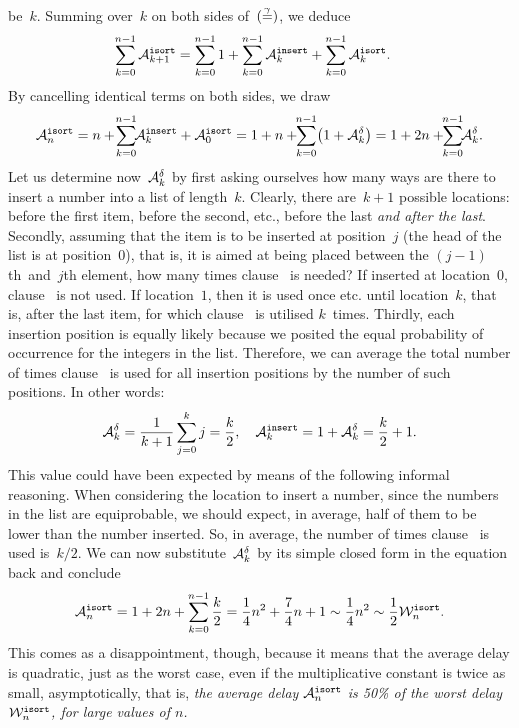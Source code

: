 be~\(k\). Summing over~\(k\) on both sides of~\((\eqn{\gamma})\), we
deduce
\begin{align*}
\sum_{k=0}^{n-1}{\ave{isort}{k+1}} &=
  \sum_{k=0}^{n-1}{1} + \sum_{k=0}^{n-1}{\ave{insert}{k}}
  + \sum_{k=0}^{n-1}{\ave{isort}{k}}.
\end{align*}
By cancelling identical terms on both sides, we draw
\[
\ave{isort}{n} = n + \!\sum_{k=0}^{n-1}{\!\!\ave{insert}{k}} +
                    \ave{isort}{0}
                 = 1 + n + \!\!\sum_{k=0}^{n-1}{\!\left(1 +
                      \aveclause{\delta}{k}\right)}
                 = 1 + 2n +\!\!\sum_{k=0}^{n-1}{\!\!\aveclause{\delta}{k}}.
\]
Let us determine now~\(\aveclause{\delta}{k}\) by first asking
ourselves how many ways are there to insert a number into a list of
length~\(k\). Clearly, there are~\(k+1\) possible locations: before
the first item, before the second, etc., before the last \emph{and
  after the last}. Secondly, assuming that the item is to be inserted
at position~\(j\) (the head of the list is at position~\(0\)), that
is, it is aimed at being placed between the \((j-1)\)th~and~\(j\)th
element, how many times clause~\clause{\delta} is needed? If inserted
at location~\(0\), clause~\clause{\delta} is not used. If
location~\(1\), then it is used once etc. until location~\(k\), that
is, after the last item, for which clause~\clause{\delta} is utilised
\(k\)~times. Thirdly, each insertion position is equally likely
because we posited the equal probability of occurrence for the
integers in the list. Therefore, we can average the total number of
times clause~\clause{\delta} is used for all insertion positions by
the number of such positions. In other words:\label{ave_insert}
\begin{equation}
\aveclause{\delta}{k} = \frac{1}{k+1}\sum_{j=0}^{k}{j}
                      = \frac{k}{2},\quad
\ave{insert}{k}       = 1 + \aveclause{\delta}{k}
                      = \frac{k}{2} + 1.\label{ave:insert}
\end{equation}
This value could have been expected by means of the following informal
reasoning. When considering the location to insert a number, since the
numbers in the list are equi\-probable, we should expect, in average,
half of them to be lower than the number inserted. So, in average, the
number of times clause~\clause{\delta} is used is~\(k/2\). We can now
substitute~\(\aveclause{\delta}{k}\) by its simple closed form in the
equation back and conclude\label{ave_isort}
\begin{equation}
\ave{isort}{n} = 1 + 2n + \sum_{k=0}^{n-1}{\frac{k}{2}}
               = \frac{1}{4}{n^2} + \frac{7}{4}{n} + 1
\mathrel{\sim} \frac{1}{4}n^2
                 \mathrel{\sim} \frac{1}{2} \worst{isort}{n}.
\label{ave:isort}
\end{equation}
This comes as a disappointment, though, because it means that the
average delay is quadratic, just as the worst case, even if the
multiplicative constant is twice as small, asymptotically, that is,
\emph{the average delay \(\ave{isort}{n}\) is 50\% of the worst delay
  \(\worst{isort}{n}\), for large values of \(n\).}

